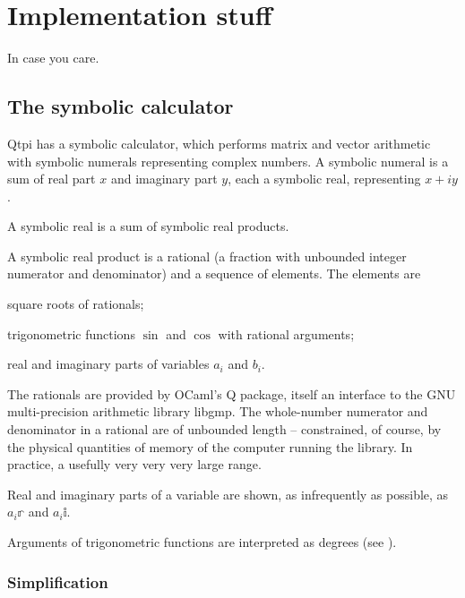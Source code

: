 
\chapter{Implementation stuff}

In case you care.

\section{The symbolic calculator}

Qtpi has a symbolic calculator, which performs matrix and vector arithmetic with symbolic numerals representing complex numbers. A symbolic numeral is a sum of real part $x$ and imaginary part $y$, each a symbolic real, representing $x+iy$.

A symbolic real is a sum of symbolic real products. 

A symbolic real product is a rational (a fraction with unbounded integer numerator and denominator) and a sequence of elements. The elements are 
\begin{itemize*}
\item square roots of rationals;
\item trigonometric functions $\sin{}$ and $\cos{}$ with rational arguments;
\item real and imaginary parts of variables $a_{i}$ and $b_{i}$.
\end{itemize*}

The rationals are provided by OCaml's Q package, itself an interface to the GNU multi-precision arithmetic library libgmp. The whole-number numerator and denominator in a rational are of unbounded length -- constrained, of course, by the physical quantities of memory of the computer running the library.  In practice, a usefully very very very large range.

Real and imaginary parts of a variable are shown, as infrequently as possible, as $a_{i}\mathbb{r}$ and $a_{i}\mathbb{i}$.

Arguments of trigonometric functions are interpreted as degrees (see ).

\subsection{Simplification}

